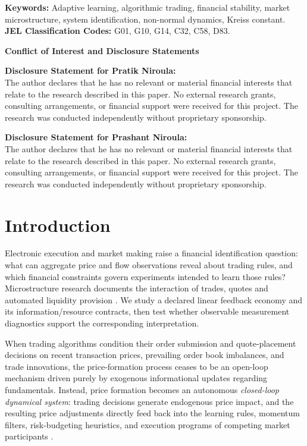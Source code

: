 \documentclass[12pt]{article}
\theoremstyle{definition}
\theoremstyle{remark}
\begin{document}
\vspace{1.0em}
\noindent\textbf{Keywords:} Adaptive learning, algorithmic trading, financial stability, market microstructure, system identification, non-normal dynamics, Kreiss constant.\\
\textbf{JEL Classification Codes:} G01, G10, G14, C32, C58, D83.

\newpage
\thispagestyle{empty}
\begin{center}
{\Large\bfseries Conflict of Interest and Disclosure Statements}
\end{center}
\vspace{2.5em}

\noindent\textbf{Disclosure Statement for Pratik Niroula:}\\
The author declares that he has no relevant or material financial interests that relate to the research described in this paper. No external research grants, consulting arrangements, or financial support were received for this project. The research was conducted independently without proprietary sponsorship.

\vspace{2.5em}

\noindent\textbf{Disclosure Statement for Prashant Niroula:}\\
The author declares that he has no relevant or material financial interests that relate to the research described in this paper. No external research grants, consulting arrangements, or financial support were received for this project. The research was conducted independently without proprietary sponsorship.

\newpage
\setcounter{page}{1}

\section{Introduction}
\label{sec:intro}

Electronic execution and market making raise a financial identification question: what can aggregate price and flow observations reveal about trading rules, and which financial constraints govern experiments intended to learn those rules? Microstructure research documents the interaction of trades, quotes and automated liquidity provision \citep{hasbrouck1991,menkveld2013,budish2015}. We study a declared linear feedback economy and its information/resource contracts, then test whether observable measurement diagnostics support the corresponding interpretation.

When trading algorithms condition their order submission and quote-placement decisions on recent transaction prices, prevailing order book imbalances, and trade innovations, the price-formation process ceases to be an open-loop mechanism driven purely by exogenous informational updates regarding fundamentals. Instead, price formation becomes an autonomous \emph{closed-loop dynamical system}: trading decisions generate endogenous price impact, and the resulting price adjustments directly feed back into the learning rules, momentum filters, risk-budgeting heuristics, and execution programs of competing market participants \citep{bouchaud2004fluctuations,cont2010stochastic,cont2014}. 
\end{document}
